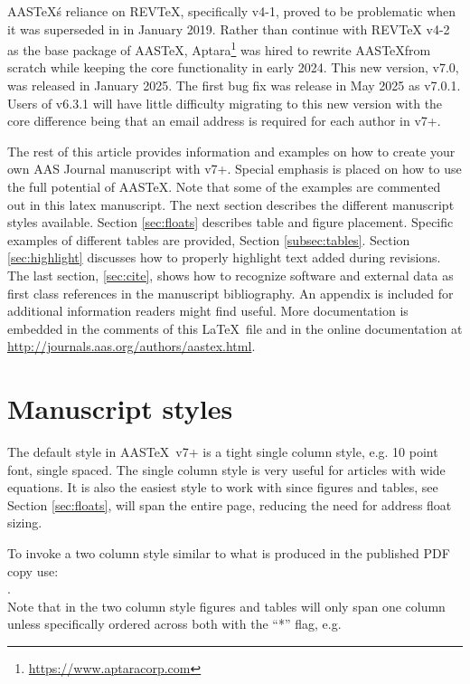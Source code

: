 \documentclass[linenumbers,trackchanges]{aastex701}
\newcommand\aastex{AAS\TeX}
\newcommand\latex{La\TeX}
\begin{document}
\aastex\'s reliance on REVTeX, specifically v4-1, proved to be problematic when it was superseded in in January 2019. Rather than continue with REVTeX v4-2 as the base package of \aastex, Aptara\footnote{\url{https://www.aptaracorp.com}} was hired to rewrite \aastex from scratch while keeping the core functionality in early 2024. This new version, v7.0, was released in January 2025. The first bug fix was release in May 2025 as v7.0.1. Users of v6.3.1 will have little difficulty migrating to this new version with the core difference being that an email address is required for each author in v7+.

The rest of this article provides information and examples on how to create
your own AAS Journal manuscript with v7+.  Special emphasis is placed on
how to use the full potential of \aastex. Note that some of the examples are commented out in this latex manuscript. The next section describes
the different manuscript styles available.
Section \ref{sec:floats} describes table and figure placement. 
Specific examples of different tables are provided,  Section
\ref{subsec:tables}.
Section \ref{sec:highlight}
discusses how to properly highlight text added during revisions.  
The last section,
\ref{sec:cite}, shows how to recognize software and external data as first
class references in the manuscript bibliography.  An appendix is included
for additional information readers might find useful.
More documentation is embedded in the comments of this \latex\ file and in the online documentation at
\url{http://journals.aas.org/authors/aastex.html}.

\section{Manuscript styles} \label{sec:style}

The default style in \aastex\ v7+ is a tight single column style, e.g. 10
point font, single spaced.  The single column style is very useful for
articles with wide equations. It is also the easiest style to work with
since figures and tables, see Section \ref{sec:floats}, will span the
entire page, reducing the need for address float sizing.

To invoke a two column style similar to what is produced in
the published PDF copy use: \\

. \\

\noindent Note that in the two column style figures and tables will only
span one column unless specifically ordered across both with the ``*'' flag,
e.g. \\
\end{document}
